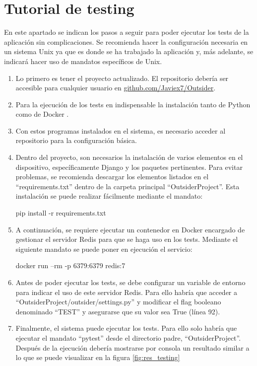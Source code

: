 \section{Tutorial de testing}
\label{sect:testing}

En este apartado se indican los pasos a seguir para poder ejecutar los tests de la aplicación sin complicaciones. Se recomienda hacer
la configuración necesaria en un sistema Unix ya que es donde se ha trabajado la aplicación y, más adelante, se indicará hacer uso de mandatos 
específicos de Unix.

\begin{enumerate}
	\item Lo primero es tener el proyecto actualizado. El repositorio debería ser accesible para cualquier usuario en 
            \href{https://github.com/Javiex7/Outsider}{github.com/Javiex7/Outsider}.
	\item Para la ejecución de los tests en indispensable la instalación tanto de Python \cite{installPython} como de Docker \cite{installDocker}.
	\item Con estos programas instalados en el sistema, es necesario acceder al repositorio para la configuración básica.
	\item Dentro del proyecto, son necesarios la instalación de varios elementos en el dispositivo, específicamente Django y los paquetes
	      pertinentes. Para evitar problemas, se recomienda descargar los elementos listados en el ``requirements.txt'' dentro de la carpeta principal
	      ``OutsiderProject''. Esta instalación se puede realizar fácilmente mediante el mandato: 
	      	                
	      pip install -r requirements.txt
	      	      
	\item A continuación, se requiere ejecutar un contenedor en Docker encargado de gestionar el servidor Redis para
	      que se haga uso en los tests. Mediante el siguiente mandato se puede poner en ejecución el servicio:
	      	      
	      docker run --rm -p 6379:6379 redis:7
	      	      
	\item Antes de poder ejecutar los tests, se debe configurar un variable de entorno para indicar el uso de 
	      este servidor Redis. Para ello habría que acceder a ``OutsiderProject/outsider/settings.py'' y modificar
	      el flag booleano denominado ``TEST'' y asegurarse que su valor sea True (línea 92).
	      	      
	\item Finalmente, el sistema puede ejecutar los tests. Para ello solo habría que ejecutar el mandato ``pytest''
	      desde el directorio padre, ``OutsiderProject''. Después de la ejecución debería mostrarse por consola
	      un resultado similar a lo que se puede visualizar en la figura \ref{fig:res_testing}
	      	         
\end{enumerate}	

